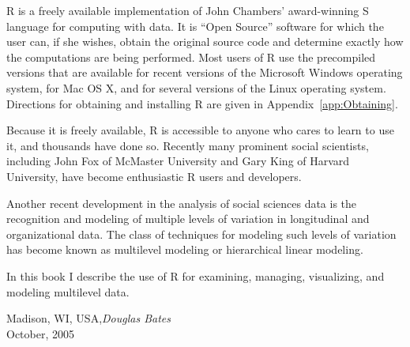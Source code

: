 %
%
%

\preface

R is a freely available implementation of John Chambers' award-winning
S language for computing with data.  It is ``Open Source'' software
for which the user can, if she wishes, obtain the original source code
and determine exactly how the computations are being performed.  Most
users of R use the precompiled versions that are available for recent
versions of the Microsoft Windows operating system, for Mac OS X, and
for several versions of the Linux operating system.  Directions for
obtaining and installing R are given in Appendix~\ref{app:Obtaining}.

Because it is freely available, R is accessible to anyone who cares to
learn to use it, and thousands have done so. Recently many prominent
social scientists, including John Fox of McMaster University and Gary
King of Harvard University, have become enthusiastic R users and
developers.

Another recent development in the analysis of social sciences data is
the recognition and modeling of multiple levels of variation in
longitudinal and organizational data.  The class of techniques for
modeling such levels of variation has become known as multilevel
modeling or hierarchical linear modeling.

In this book I describe the use of R for examining, managing, 
visualizing, and modeling multilevel data.


\vspace{1cm}
\begin{flushright}\noindent
Madison, WI, USA,\hfill {\it Douglas Bates}\\
October, 2005\\
\end{flushright}


